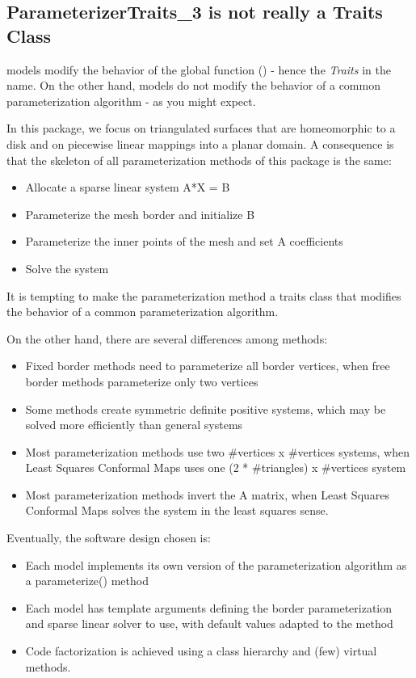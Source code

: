 \subsection{ParameterizerTraits\_3 is not really a Traits Class}

 models modify the behavior of the global function
() - hence the {\em Traits} in the name.
On the other hand,  models do not modify the behavior
of a common parameterization algorithm - as you might expect.

In this package, we focus on triangulated surfaces that are homeomorphic to a
disk and on piecewise linear mappings into a planar domain.
A consequence is that the skeleton of all parameterization methods of this
package is the same:
\begin{itemize}
\item Allocate a sparse linear system A*X = B
\item Parameterize the mesh border and initialize B
\item Parameterize the inner points of the mesh and set A coefficients
\item Solve the system
\end{itemize}

It is tempting to make the parameterization method a traits class that
modifies the behavior of a common parameterization algorithm.

On the other hand, there are several differences among methods:
\begin{itemize}
\item Fixed border methods need to parameterize all border vertices,
      when free border methods parameterize only two vertices
\item Some methods create symmetric definite positive systems,
      which may be solved more efficiently than general systems
\item Most parameterization methods use two \#vertices x \#vertices systems,
      when Least Squares Conformal Maps uses one (2 * \#triangles) x \#vertices system
\item Most parameterization methods invert the A matrix,
      when Least Squares Conformal Maps solves the system in the least squares sense.
\end{itemize}

Eventually, the software design chosen is:
\begin{itemize}
\item Each  model implements its own version
      of the parameterization algorithm as a parameterize() method
\item Each  model has template arguments
      defining the border parameterization and sparse linear solver to use,
      with default values adapted to the method
\item Code factorization is achieved using a class hierarchy and (few) virtual methods.
\end{itemize}


